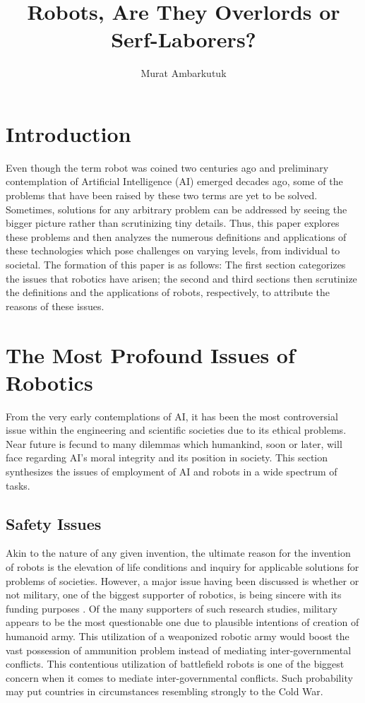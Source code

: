 \documentclass[man]{apa6}
\title{Robots, Are They Overlords or Serf-Laborers?}
\author{Murat Ambarkutuk}
\affiliation{English Language Institute, University of Delaware \\ murata@udel.
edu}
\begin{document}
\maketitle

\section{Introduction}
Even though the term robot was coined two centuries ago and preliminary contemplation of Artificial Intelligence (AI) emerged decades ago, some of the problems that have been raised by these two terms are yet to be solved.
Sometimes, solutions for any arbitrary problem can be addressed by seeing the bigger picture rather than scrutinizing tiny details.
Thus, this paper explores these problems and then analyzes the numerous definitions and applications of these technologies which pose challenges on varying levels, from individual to societal.
The formation of this paper is as follows: The first section categorizes the issues that robotics have arisen; the second and third sections then scrutinize the definitions and the applications of robots, respectively, to attribute the reasons of these issues. 

\section{The Most Profound Issues of Robotics}
From the very early contemplations of AI, it has been the most controversial issue within the engineering and scientific societies due to its ethical problems.
Near future is fecund to many dilemmas which humankind, soon or later, will face regarding AI's moral integrity and its position in society.
This section synthesizes the issues of employment of AI and robots in a wide spectrum of tasks.

\subsection{Safety Issues}
Akin to the nature of any given invention, the ultimate reason for the invention of robots is the elevation of life conditions and inquiry for applicable solutions for problems of societies.
However, a major issue having been discussed is whether or not military, one of the biggest supporter of robotics, is being sincere with its funding purposes \cite{gre}.
Of the many supporters of such research studies, military appears to be the most questionable one due to plausible intentions of creation of humanoid army.
This utilization of a weaponized robotic army would boost the vast possession of ammunition problem instead of mediating inter-governmental conflicts.
This contentious utilization of battlefield robots is one of the biggest concern when it comes to mediate inter-governmental conflicts. Such probability may put countries in circumstances resembling strongly to the Cold War. \par
\end{document}
